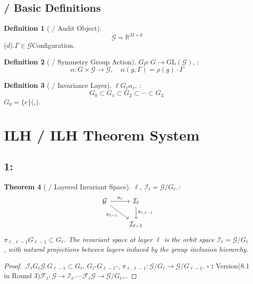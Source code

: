 \documentclass[11pt,a4paper]{article}
\theoremstyle{plain}
\newtheorem{theorem}{Theorem}[section]
\theoremstyle{definition}
\newtheorem{definition}[theorem]{Definition}
\theoremstyle{remark}
\newcommand{\RR}{\mathbb{R}}
\newcommand{\cG}{\mathcal{G}}
\newcommand{\cI}{\mathcal{I}}
\newcommand{\cF}{\mathcal{F}}
\begin{document}
{\subsection{ / Basic Definitions}
\begin{definition}[ / Audit Object]
\label{def:audit-object}
\begin{equation}
 \cG = \RR^{M \times d}
\end{equation}
($d$).$\Gamma \in \cG$Configuration.
\end{definition}
\begin{definition}[ / Symmetry Group Action]
\label{def:group-action}
$G$$\rho: G \to \text{GL}(\cG)$, : 
\begin{equation}
 \alpha: G \times \cG \to \cG, \quad \alpha(g, \Gamma) = \rho(g) \cdot \Gamma
\end{equation}
\end{definition}
\begin{definition}[ / Invariance Layer]
\label{def:invariance-layer}
$\ell$$G_\ell$$\alpha_\ell$, : 
\begin{equation}
 G_0 \subset G_1 \subset G_2 \subset \cdots \subset G_L
\end{equation}
$G_0 = \{e\}$(,).
\end{definition}
\section{ILH / ILH Theorem System}
\label{sec:ilh-theorems}
\subsection{1:}
\begin{theorem}[ / Layered Invariant Space]
\label{thm:ilh-invariant-space}
$\ell$, $\cI_\ell = \cG / G_\ell$.: 
\begin{equation}
\begin{tikzcd}
\cG \arrow[r, "\pi_\ell"] \arrow[rd, "\pi_{\ell-1}"'] & \cI_\ell \arrow[d, "\pi_{\ell, \ell-1}"] \\
& \cI_{\ell-1}
\end{tikzcd}
\end{equation}
$\pi_{\ell, \ell-1}$$G_{\ell-1} \subset G_\ell$.
\textit{The invariant space at layer $\ell$ is the orbit space $\cI_\ell = \cG / G_\ell$, with natural projections between layers induced by the group inclusion hierarchy.}
\end{theorem}
\begin{proof}
.$\cI_\ell$$G_\ell$$\cG$.$G_{\ell-1} \subset G_\ell$, $G_\ell$-$G_{\ell-1}$-, $\pi_{\ell, \ell-1}: \cG/G_\ell \to \cG/G_{\ell-1}$.
$\square$ \textbf{: } Version(8.1 in Round 3)$\cF_\ell: \cG \to \cI_\ell$.---$\cF_\ell$$\cG \to \cG/G_\ell$,..
\end{proof}
}
\end{document}
